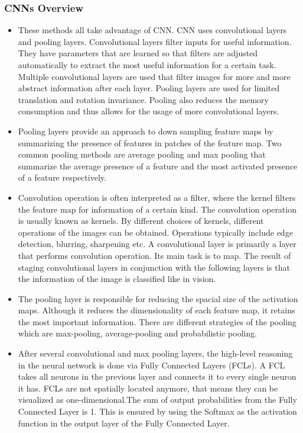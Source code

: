        \subsubsection{CNNs Overview}
            \begin{itemize}
                \item These methods all take advantage of CNN. CNN uses convolutional layers and pooling layers. Convolutional layers filter inputs for useful information. They have parameters that are learned so that filters are adjusted automatically to extract the most useful information for a certain task. Multiple convolutional layers are used that filter images for more and more abstract information after each layer. Pooling layers are used for limited translation and rotation invariance. Pooling also reduces the memory consumption and thus allows for the usage of more convolutional layers.
                \item Pooling layers provide an approach to down sampling feature maps by summarizing the presence of features in patches of the feature map. Two common pooling methods are average pooling and max pooling that summarize the average presence of a feature and the most activated presence of a feature respectively.
                \item Convolution operation is often interpreted as a filter, where the kernel filters the feature map for information of a certain kind. The convolution operation is usually known as kernels. By different choices of kernels, different operations of the images can be obtained. Operations typically include edge detection, blurring, sharpening etc. A convolutional layer is primarily a layer that performs convolution operation. Its main task is to map. The result of staging convolutional layers in conjunction with the following layers is that the information of the image is classified like in vision.
                \item The pooling layer is responsible for reducing the spacial size of the activation maps. Although it reduces the dimensionality of each feature map, it retains the most important information. There are different strategies of the pooling which are max-pooling, average-pooling and probabilistic pooling.
                \item After several convolutional and max pooling layers, the high-level reasoning in the neural network is done via Fully Connected Layers (FCLs). A FCL takes all neurons in the previous layer and connects it to every single neuron it has. FCLs are not spatially located anymore, that means they can be visualized as one-dimensional.The sum of output probabilities from the Fully Connected Layer is 1. This is ensured by using the Softmax as the activation function in the output layer of the Fully Connected Layer.

\end{itemize}
